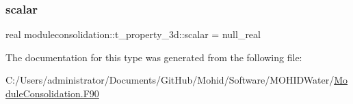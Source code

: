 \mbox{\label{structmoduleconsolidation_1_1t__property__3d_a68e183c621bef7f7be2fddf4a6c436d2}} 
\subsubsection{\texorpdfstring{scalar}{scalar}}
{\footnotesize\ttfamily real moduleconsolidation\+::t\+\_\+property\+\_\+3d\+::scalar = null\+\_\+real\hspace{0.3cm}{\ttfamily [private]}}



The documentation for this type was generated from the following file\+:\begin{DoxyCompactItemize}
\item 
C\+:/\+Users/administrator/\+Documents/\+Git\+Hub/\+Mohid/\+Software/\+M\+O\+H\+I\+D\+Water/\mbox{\hyperlink{_module_consolidation_8_f90}{Module\+Consolidation.\+F90}}\end{DoxyCompactItemize}
